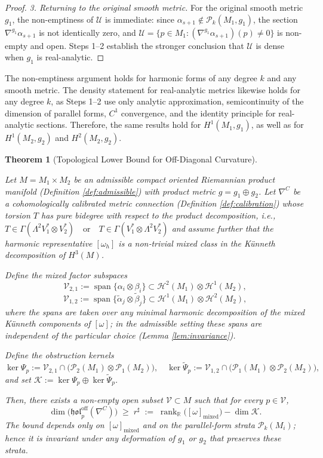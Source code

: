 \documentclass[11pt,reqno]{amsart}
\theoremstyle{plain}
\newtheorem{theorem}{Theorem}[section]
\theoremstyle{definition}
\numberwithin{equation}{section}
\begin{document}
\begin{proof}
\noindent\textit{3.  Returning to the original smooth metric.}
For the original smooth metric $g_1$, the non-emptiness
of $\mathcal{U}$ is immediate: since $\alpha_{s+1} \notin
\mathcal P_k(M_1, g_1)$, the section $\nabla^{g_1}\alpha_{s+1}$ is not
identically zero, and $\mathcal{U} = \{p \in M_1 :
(\nabla^{g_1}\alpha_{s+1})(p) \neq 0\}$ is non-empty and open.
Steps 1--2 establish the stronger conclusion that $\mathcal{U}$ is
dense when $g_1$ is real-analytic. 
\end{proof}

The non-emptiness argument holds for harmonic forms of any
degree $k$ and any smooth metric. The density statement for
real-analytic metrics likewise holds for any degree $k$, as
Steps 1--2 use only analytic approximation, semicontinuity of the dimension of parallel forms, $C^1$ convergence, and the identity principle for real-analytic sections.  Therefore, the same results hold for $H^1(M_1, g_1)$, as well as for $H^1(M_2, g_2)$ and $H^2(M_2, g_2)$.

\medskip

\begin{theorem}[Topological Lower Bound for Off-Diagonal Curvature]
\label{thm:main}

Let $M = M_1 \times M_2$ be an admissible compact oriented Riemannian product manifold 
(Definition \ref{def:admissible}) with product metric $g = g_1 \oplus g_2$.  
Let $\nabla^C$ be a cohomologically calibrated metric connection (Definition \ref{def:calibration}) whose torsion $T$ has pure bidegree with respect to the product decomposition, i.e.,
$T \in \Gamma(\Lambda^2 V_1^* \otimes V_2^*) \quad \text{or} \quad T \in \Gamma(V_1^* \otimes \Lambda^2 V_2^*)$ and assume further that the harmonic representative $[\omega_h]$ is a non‑trivial mixed class in the Künneth decomposition of $H^3(M)$.

Define the mixed factor subspaces
\[
\mathcal{V}_{2,1}:=\operatorname{span}\{\alpha_i\otimes\beta_i\}\subset\mathcal{H}^2(M_1)\otimes\mathcal{H}^1(M_2),
\]
\[
\mathcal{V}_{1,2}:=\operatorname{span}\{\tilde\alpha_j\otimes\tilde\beta_j\}\subset\mathcal{H}^1(M_1)\otimes\mathcal{H}^2(M_2),
\]
where the spans are taken over any minimal harmonic decomposition of the mixed Künneth 
components of $[\omega]$; in the admissible setting these spans are independent of the 
particular choice (Lemma \ref{lem:invariance}).

Define the obstruction kernels
\[
\ker\Psi_p:=\mathcal{V}_{2,1}\cap\bigl(\mathcal{P}_2(M_1)\otimes\mathcal{P}_1(M_2)\bigr),\quad
\ker\widetilde{\Psi}_p:=\mathcal{V}_{1,2}\cap\bigl(\mathcal{P}_1(M_1)\otimes\mathcal{P}_2(M_2)\bigr),
\]
and set $\mathcal{K}:=\ker\Psi_p\oplus\ker\widetilde{\Psi}_p$.

Then, there exists a non-empty open subset $\mathcal{V} \subset M$ such that for every $p\in \mathcal{V}$,
\[
\dim\bigl(\mathfrak{hol}_p^{\mathrm{off}}(\nabla^{C})\bigr)\;\geq\;
r^\sharp\;:=\;\operatorname{rank}_{\mathbb{R}}\bigl([\omega]_{\mathrm{mixed}}\bigr)-\dim\mathcal{K}.
\]
The bound depends only on $[\omega]_{\text{mixed}}$ and on the parallel-form strata $\mathcal{P}_k(M_i)$; hence it is invariant under any deformation of $g_1$ or $g_2$ that preserves these strata.
\end{theorem}
\end{document}
